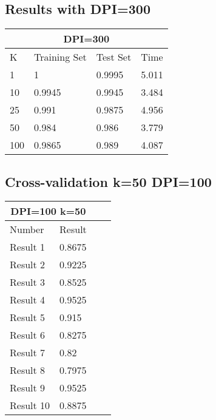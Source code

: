 \documentclass[paper=a4, fontsize=11pt]{scrartcl} %
\numberwithin{equation}{section} %
\numberwithin{figure}{section} %
\numberwithin{table}{section} %
\begin{document}
\subsection*{Results with DPI=300}
\begin{tabular}{ |p{3cm}|p{3cm}|p{3cm}|p{3cm}|  }
 \hline
 \multicolumn{4}{|c|}{DPI=300} \\
 \hline
 K & Training Set & Test Set & Time\\
 \hline
 1 & 1 & 0.9995 & 5.011\\
 10 & 0.9945 & 0.9945 & 3.484\\
 25 & 0.991 & 0.9875 & 4.956\\
 50 & 0.984 & 0.986 & 3.779\\
 100 & 0.9865 & 0.989 & 4.087\\
 \hline
\end{tabular}

\subsection*{Cross-validation k=50 DPI=100}
\begin{center}
\begin{tabular}{ |p{3cm}|p{3cm}|p{3cm}|p{3cm}|  }
 \hline
 \multicolumn{2}{|c|}{DPI=100 k=50} \\
 \hline
 Number & Result\\
 \hline
 Result 1 & 0.8675 \\
 Result 2 & 0.9225 \\
 Result 3 & 0.8525 \\
 Result 4 & 0.9525\\ 
 Result 5 & 0.915 \\
 Result 6 & 0.8275 \\
 Result 7 & 0.82 \\
 Result 8 & 0.7975 \\
 Result 9 & 0.9525 \\
 Result 10 & 0.8875\\
 \hline
\end{tabular}
\end{center}
\end{document}
